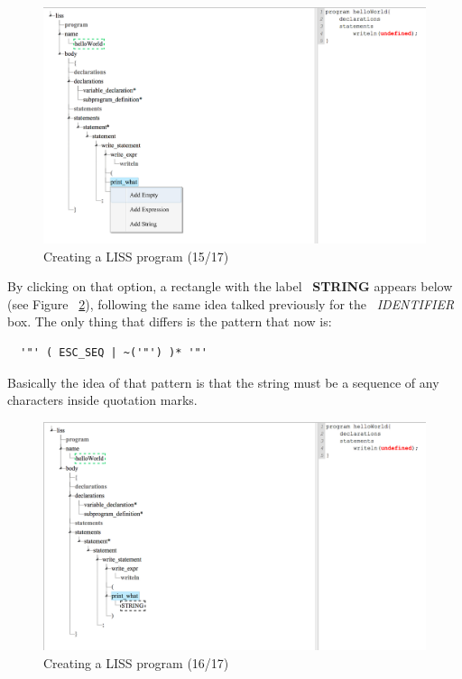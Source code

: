 \documentclass[
  oneside,
  11pt, a4paper,
  footinclude=true,
  headinclude=true,
  cleardoublepage=empty
]{scrbook}
\begin{document}
\begin{figure}[h!]
  \centering
    \includegraphics[width=1\textwidth]{img/LISS-SDE_creating_program/LISS-SDE15.png}
    \caption{Creating a LISS program (15/17)}
    \label{fig:LISS-SDE_example_15}
\end{figure}

By clicking on that option, a rectangle with the label ~\textbf{STRING} appears below (see Figure ~\ref{fig:LISS-SDE_example_16}), following the same idea talked previously for  the ~\textit{IDENTIFIER} box. The only thing that differs is the pattern that now is:

\begin{lstlisting}
  '"' ( ESC_SEQ | ~('"') )* '"'
\end{lstlisting}

Basically the idea of that pattern is that the string must be a sequence of any characters inside quotation marks.

\begin{figure}[h!]
  \centering
    \includegraphics[width=1\textwidth]{img/LISS-SDE_creating_program/LISS-SDE16.png}
    \caption{Creating a LISS program (16/17)}
    \label{fig:LISS-SDE_example_16}
\end{figure}
\end{document}
